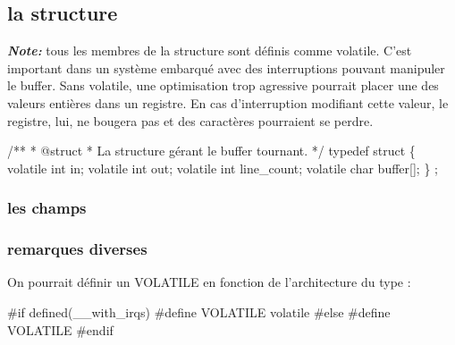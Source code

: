 \documentclass[10pt]{article}%
\begin{document}
\subsection{la structure}

\textbf{\textit{Note: }} tous les membres de la structure sont définis comme {\Tt{}volatile\nwendquote}. C'est important dans un système embarqué avec des interruptions pouvant manipuler le buffer. Sans {\Tt{}volatile\nwendquote}, une optimisation trop agressive pourrait placer une des valeurs entières dans un registre. En cas d'interruption modifiant cette valeur, le registre, lui, ne bougera pas et des caractères pourraient se perdre.

\nwenddocs{}\endmoddef\nwstartdeflinemarkup{}\nwenddeflinemarkup
/**
 * @struct 
 * La structure gérant le buffer tournant.
 */
typedef struct \{
    volatile int in;
    volatile int out;
    volatile int line_count;
    volatile char buffer[];
\} ;
\eatline
{}\nwendcode{}\nwdocspar
\nwenddocs{}\nwdocspar
\subsubsection{les champs}
\subsubsection{remarques diverses}
On pourrait définir un {\Tt{}VOLATILE\nwendquote} en fonction de l'architecture du type :

\nwenddocs{}\endmoddef\nwstartdeflinemarkup\nwenddeflinemarkup
#if defined(__with_irqs)
  #define VOLATILE volatile
#else
  #define VOLATILE
#endif
\end{document}
